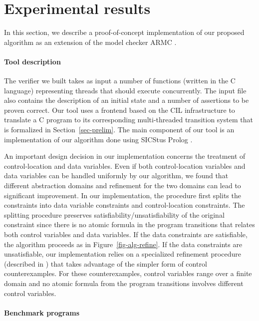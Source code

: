 \section{Experimental results} \label{sec-experiments}

In this section, we describe a proof-of-concept implementation of our
proposed algorithm as an extension of the model checker ARMC 
\cite{RybalPodelskiPADL07}.


\paragraph{Tool description}
The verifier we built takes as input a number of functions (written in
the C language) representing threads that should execute concurrently.
The input file also contains the description of an initial state and
a number of assertions to be proven correct.
Our tool uses a frontend based on the CIL infrastructure
\cite{NeculaCC02} to translate a C program to its corresponding
multi-threaded transition system that is formalized in
Section~\ref{sec-prelim}.
The main component of our tool is an implementation of our algorithm
done using SICStus Prolog \cite{sicstus}.

An important design decision in our implementation concerns the 
treatment of control-location and data variables.
Even if both control-location variables and data variables can be
handled uniformly by our algorithm, we found that different
abstraction domains and refinement for the two domains can lead to
significant improvement.
In our implementation, the \algRefine procedure first splits the
constraints into data variable constraints and control-location
constraints. 
The splitting procedure preserves satisfiability/unsatisfiability of
the original constraint since there is no atomic formula in the
program transitions that relates both control variables and data
variables.
If the data constraints are satisfiable, the algorithm proceeds as in
Figure~\ref{fig-alg-refine}.
If the data constraints are unsatisfiable, our implementation relies
on a specialized refinement procedure (described in
\cite{GuptaATVA10}) that takes advantage of the simpler form of
control counterexamples.
For these counterexamples, control variables range over a finite
domain and no atomic formula from the program transitions involves
different control variables.



\paragraph{Benchmark programs} 

